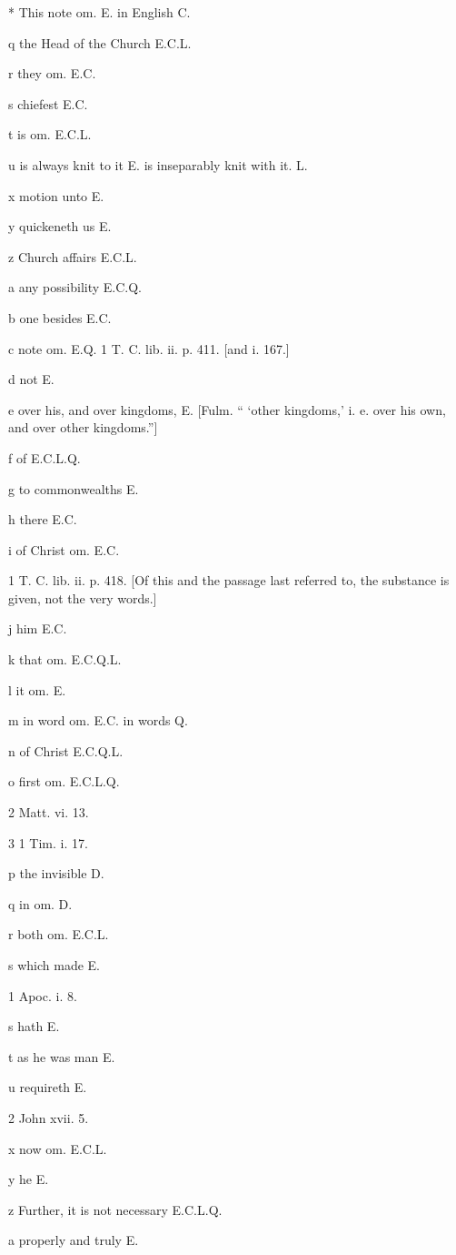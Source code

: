 *
This note om. E. in English C.

q
the Head of the Church E.C.L.

r
they om. E.C.

s
chiefest E.C.

t
is om. E.C.L.

u
is always knit to it E. is inseparably knit with it. L.

x
motion unto E.

y
quickeneth us E.

z
Church affairs E.C.L.

a
any possibility E.C.Q.

b
one besides E.C.

c note om. E.Q.
1
T. C. lib. ii. p. 411. [and i. 167.]

d
not E.

e
over his, and over kingdoms, E. [Fulm. “ ‘other kingdoms,’ i. e. over his own, and over other kingdoms.”]

f
of E.C.L.Q.

g
to commonwealths E.

h
there E.C.

i
of Christ om. E.C.

1
T. C. lib. ii. p. 418. [Of this and the passage last referred to, the substance is given, not the very words.]

j
him E.C.

k
that om. E.C.Q.L.

l
it om. E.

m
in word om. E.C. in words Q.

n
of Christ E.C.Q.L.

o
first om. E.C.L.Q.

2
Matt. vi. 13.

3
1 Tim. i. 17.

p
the invisible D.

q
in om. D.

r
both om. E.C.L.

s
which made E.

1
Apoc. i. 8.

s
hath E.

t
as he was man E.

u
requireth E.

2
John xvii. 5.

x
now om. E.C.L.

y
he E.

z
Further, it is not necessary E.C.L.Q.

a
properly and truly E.

